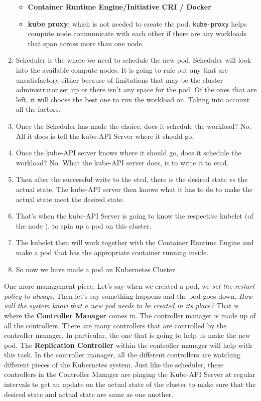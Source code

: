 \documentclass{article}
\begin{document}
\begin{enumerate}
\begin{itemize}
        \item \textbf{Container Runtime Engine/Initiative CRI / Docker}
        \item \textbf{kube proxy}: which is not needed to create the pod. \lstinline{kube-proxy} helps compute node communicate with each other if there are any workloads that span across more than one node. 
    \end{itemize}
    \item Scheduler is the where we need to schedule the new pod. Scheduler will look into the available compute nodes. It is going to rule out any that are unsatisfactory either because of limitations that may be the cluster administrator set up or there isn't any space for the pod. Of the ones that are left, it will choose the best one to run the workload on. Taking into account all the factors. 
    \item Once the Scheduler has made the choice, does it schedule the workload? No. All it does is tell the kube-API Server where it should go. 
    \item Once the kube-API server knows where it should go, does it schedule the workload? No. What the kube-API server does, is to write it to etcd. 
    \item Then after the successful write to the etcd, there is the desired state vs the actual state. The kube-API server then knows what it has to do to make the actual state meet the desired state.
    \item That's when the kube-API Server is going to know the respective kubelet (of the node ), to spin up a pod on this cluster. 
    \item The kubelet then will work together with the Container Runtime Engine and make a pod that has the appropriate container running inside.
    \item So now we have made a pod on Kubernetes Cluster. 
\end{enumerate}
One more management piece. Let's say when we created a pod, we \textit{set the restart policy to always}. Then let's say something happens and the pod goes down. \textit{How will the system know that a new pod needs to be created in its place?} That is where the \textbf{Controller Manager} comes in. The controller manager is made up of all the controllers. There are many controllers that are controlled by the controller manager. In particular, the one that is going to help us make the new pod. The \textbf{Replication Controller} within the controller manager will help with this task.  In the controller manager, all the different controllers are watching different pieces of the Kubernetes system. Just like the scheduler, these controllers in the Controller Manager are pinging the Kube-API Server at regular intervals to get an update on the actual state of the cluster to make sure that the desired state and actual state are same as one another. \\
\end{document}

